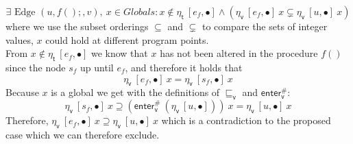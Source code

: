     \[\exists \text{ Edge }(u, f();, v),\ x \in Globals: x \notin \eta_\textsf{t}\ [e_f, \bullet] \land (\eta_\textsf{v}\ [e_f, \bullet]\ x\subsetneq \eta_\textsf{v}\ [u, \bullet]\ x)\]
    where we use the subset orderings $\subseteq$ and $\subsetneq$ to compare the sets of integer values, $x$ could hold at different program points.\\
    From $x \notin \eta_\textsf{t}\ [e_f, \bullet]$ we know that $x$ has not been altered in the procedure $f()$ since the node $s_f$ up until $e_f$, and therefore it holds that 
    \[\eta_\textsf{v}\ [e_f, \bullet]\ x = \eta_\textsf{v}\ [s_f, \bullet]\ x\]
    Because $x$ is a global we get with the definitions of $\sqsubseteq_\textsf{v}$ and $\textsf{enter}^{\#}_\textsf{v}$: 
    \[\eta_\textsf{v}\ [s_f, \bullet]\ x \supseteq (\textsf{enter}^{\#}_\textsf{v}\ (\eta_\textsf{v}\ [u, \bullet]))\ x = \eta_\textsf{v}\ [u, \bullet]\ x\]
    Therefore, $\eta_\textsf{v}\ [e_f, \bullet]\ x\supseteq \eta_\textsf{v}\ [u, \bullet]\ x$ which is a contradiction to the proposed case which we can therefore exclude.

